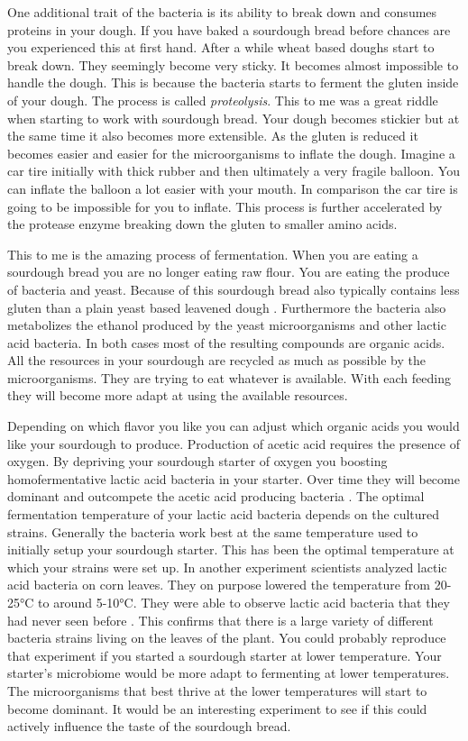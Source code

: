 One additional trait of the bacteria is its ability to break down
and consumes proteins in your dough. If you have baked a sourdough
bread before chances are you experienced this at first hand. After
a while wheat based doughs start to break down. They seemingly become
very sticky. It becomes almost impossible to handle the dough. This
is because the bacteria starts to ferment the gluten inside of your dough.
The process is called \emph{proteolysis}. This to me was a great riddle
when starting to work with sourdough bread. Your dough becomes stickier
but at the same time it also becomes more extensible. As the gluten
is reduced it becomes easier and easier for the microorganisms to inflate the
dough. Imagine a car tire initially with thick rubber and then ultimately
a very fragile balloon. You can inflate the balloon a lot easier with your
mouth. In comparison the car tire is going to be impossible for you
to inflate. This process is further accelerated by the protease
enzyme breaking down the gluten to smaller amino acids.

This to me is the amazing process of fermentation.
When you are eating a sourdough bread you are no longer eating raw flour.
You are eating the produce of bacteria and yeast. Because of this sourdough
bread also typically
contains less gluten than a plain yeast based leavened dough
\cite{proteolysis+sourdough+bacteria}. Furthermore the bacteria
also metabolizes the ethanol produced by the yeast microorganisms and other
lactic acid bacteria. In both cases most of the resulting compounds
are organic acids. All the resources in your sourdough are recycled
as much as possible by the microorganisms. They are trying to eat whatever
is available. With each feeding they will become more adapt at using
the available resources.

Depending on which flavor you like you can adjust which organic acids
you would like your sourdough to produce. Production of acetic acid
requires the presence of oxygen. By depriving your sourdough starter
of oxygen you boosting homofermentative lactic acid bacteria in your
starter. Over time they will become dominant and outcompete the acetic acid
producing bacteria \cite{acetic+acid+oxygen}. The optimal fermentation temperature of your
lactic acid bacteria depends on the cultured strains. Generally the bacteria
work best at the same temperature used to initially setup your sourdough
starter. This has been the optimal temperature at which your strains
were set up. In another experiment scientists analyzed lactic acid bacteria
on corn leaves. They on purpose lowered the temperature from 20-25°C to around 5-10°C.
They were able to observe lactic acid bacteria that they had never seen
before \cite{temperature+bacteria+corn}. This confirms that there is a
large variety of different bacteria
strains living on the leaves of the plant. You could probably reproduce
that experiment if you started a sourdough starter at lower temperature.
Your starter's microbiome would be more adapt to fermenting at lower
temperatures. The microorganisms that best thrive at the lower temperatures
will start to become dominant. It would be an interesting experiment
to see if this could actively influence the taste of the sourdough
bread.
